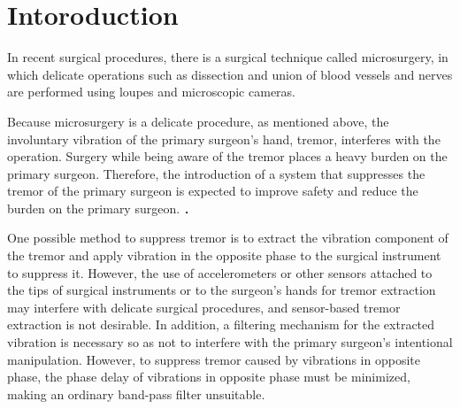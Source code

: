 \section{Intoroduction}\label{section:intro}

In recent surgical procedures, there is a surgical technique called microsurgery,
in which delicate operations such as dissection and union of blood vessels and nerves are performed using loupes and microscopic cameras.


Because microsurgery is a delicate procedure, as mentioned above, the involuntary vibration of the primary surgeon's hand, tremor, interferes with the operation.
Surgery while being aware of the tremor places a heavy burden on the primary surgeon.
Therefore, the introduction of a system that suppresses the tremor of the primary surgeon is expected to improve safety and reduce the burden on the primary surgeon.
\cite{bib:Adaptive_cancelling}\cite{bib:Design_and_Validation}．




One possible method to suppress tremor is to extract the vibration component of the tremor and apply vibration in the opposite phase to the surgical instrument to suppress it.
However, the use of accelerometers or other sensors attached to the tips of surgical instruments or to the surgeon's hands for tremor extraction may interfere with delicate surgical procedures,
and sensor-based tremor extraction is not desirable.
In addition, a filtering mechanism for the extracted vibration is necessary so as not to interfere with the primary surgeon's intentional manipulation.
However, to suppress tremor caused by vibrations in opposite phase, the phase delay of vibrations in opposite phase must be minimized, making an ordinary band-pass filter unsuitable.


